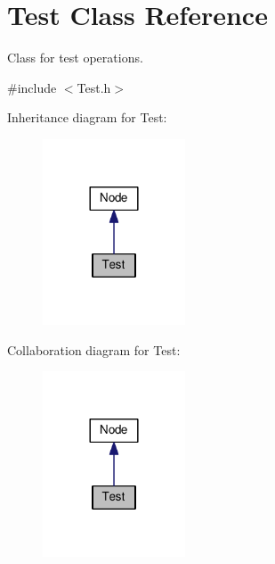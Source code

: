 \hypertarget{classTest}{}\section{Test Class Reference}
\label{classTest}


Class for test operations.  




{\ttfamily \#include $<$Test.\+h$>$}



Inheritance diagram for Test\+:\nopagebreak
\begin{figure}[H]
\begin{center}
\leavevmode
\includegraphics[width=120pt]{classTest__inherit__graph}
\end{center}
\end{figure}


Collaboration diagram for Test\+:\nopagebreak
\begin{figure}[H]
\begin{center}
\leavevmode
\includegraphics[width=120pt]{classTest__coll__graph}
\end{center}
\end{figure}
